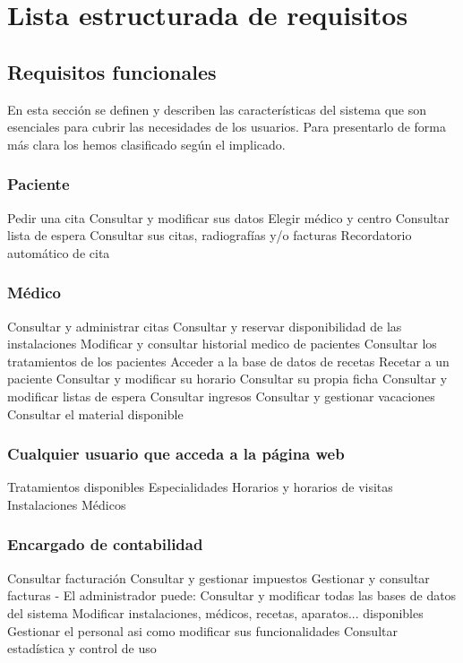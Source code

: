 \documentclass[11pt,a4paper]{article}
\newcommand{\rf}[1]{#1}
\begin{document}



\section{Lista estructurada de requisitos} %
\label{sec:lista_estructurada_de_requisitos}

\subsection{Requisitos funcionales}
En esta sección se definen y describen las características del sistema que son esenciales para cubrir las necesidades de los usuarios. Para presentarlo de forma más clara los hemos clasificado según el implicado.

\subsubsection{Paciente}
    \rf{Pedir una cita}
    \rf{Consultar y modificar sus datos}
    \rf{Elegir médico y centro}
    \rf{Consultar lista de espera}
    \rf{Consultar sus citas, radiografías y/o facturas}
    \rf{Recordatorio automático de cita}
\subsubsection{Médico}
    \rf{Consultar y administrar citas}
    \rf{Consultar y reservar disponibilidad de las instalaciones}
    \rf{Modificar y consultar historial medico de pacientes}
    \rf{Consultar los tratamientos de los pacientes}
    \rf{Acceder a la base de datos de recetas}
    \rf{Recetar a un paciente}
    \rf{Consultar y modificar su horario}
    \rf{Consultar su propia ficha}
    \rf{Consultar y modificar listas de espera    }
    \rf{Consultar ingresos}
    \rf{Consultar y gestionar vacaciones}
    \rf{Consultar el material disponible}
\subsubsection{Cualquier usuario que acceda a la página web}
    \rf{Tratamientos disponibles}
    \rf{Especialidades}
    \rf{Horarios y horarios de visitas}
    \rf{Instalaciones}
    \rf{Médicos}
\subsubsection{Encargado de contabilidad}
    \rf{Consultar facturación}
    \rf{Consultar y gestionar impuestos}
    \rf{Gestionar y consultar facturas}
  - El administrador puede:
    \rf{Consultar y modificar todas las bases de datos del sistema}
    \rf{Modificar instalaciones, médicos, recetas, aparatos...} disponibles
    \rf{Gestionar el personal asi como modificar sus funcionalidades}
    \rf{Consultar estadística y control de uso}
\end{document}
